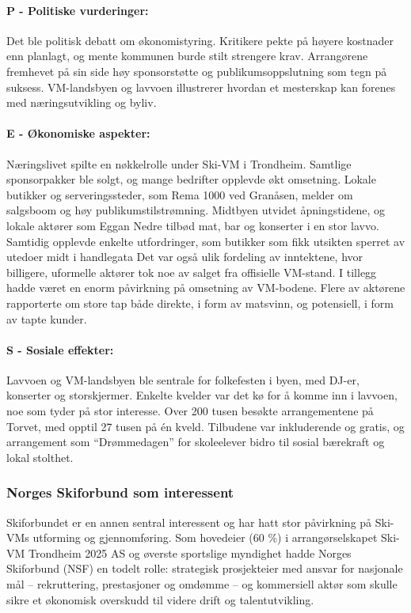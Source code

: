 \paragraph{P - Politiske vurderinger:}
Det ble politisk debatt om økonomistyring. Kritikere pekte på høyere kostnader enn planlagt, og mente kommunen burde stilt strengere krav\parencite{nettavisenKritikk}. Arrangørene fremhevet på sin side høy sponsorstøtte og publikumsoppslutning som tegn på suksess\parencite{kom24Sponsorsalg}. VM-landsbyen og lavvoen illustrerer hvordan et mesterskap kan forenes med næringsutvikling og byliv.

\paragraph{E - Økonomiske aspekter:}
Næringslivet spilte en nøkkelrolle under Ski-VM i Trondheim. Samtlige sponsorpakker ble solgt, og mange bedrifter opplevde økt omsetning\parencite{kom24Sponsorsalg}. Lokale butikker og serveringssteder, som Rema 1000 ved Granåsen, melder om salgsboom og høy publikumstilstrømning\parencite{nettavisenRema}. Midtbyen utvidet åpningstidene, og lokale aktører som Eggan Nedre tilbød mat, bar og konserter i en stor lavvo\parencite{midtbyenProgram}. Samtidig opplevde enkelte utfordringer, som butikker som fikk utsikten sperret av utedoer midt i handlegata\parencite{nettavisenToalett} Det var også ulik fordeling av inntektene, hvor billigere, uformelle aktører tok noe av salget fra offisielle VM-stand\parencite{nettavisenRema}. I tillegg hadde været en enorm påvirkning på omsetning av VM-bodene. Flere av aktørene rapporterte om store tap både direkte, i form av matsvinn, og potensiell, i form av tapte kunder\parencite{innherredTragedie}.

\paragraph{S - Sosiale effekter:}
Lavvoen og VM-landsbyen ble sentrale for folkefesten i byen, med DJ-er, konserter og 
storskjermer. Enkelte kvelder var det kø for å komme inn i lavvoen, noe som tyder på stor 
interesse. Over 200 tusen besøkte arrangementene på Torvet, med opptil 27 tusen på én kveld\parencite{wikipediaSkiVM}. 
Tilbudene var inkluderende og gratis, og arrangement som “Drømmedagen” for skoleelever bidro til 
sosial bærekraft og lokal stolthet\parencite{wikipediaSkiVM}.

\subsubsection{Norges Skiforbund som interessent}
Skiforbundet er en annen sentral interessent og har hatt stor påvirkning på Ski-VMs utforming
og gjennomføring. Som hovedeier (60 \%) i arrangørselskapet Ski-VM Trondheim 2025 AS og øverste
sportslige myndighet hadde Norges Skiforbund (NSF) en todelt rolle: strategisk prosjekteier med
ansvar for nasjonale mål -- rekruttering, prestasjoner og omdømme -- og kommersiell aktør som
skulle sikre et økonomisk overskudd til videre drift og talentutvikling\cite{ProffSkiVM2025}.

